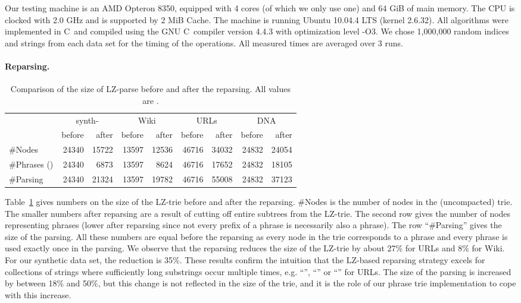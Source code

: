 \documentclass{llncs}
\newcommand{\Cpp}{C\raisebox{2pt}{{\relsize{-3}++}}\ }
\begin{document}
Our testing machine is an AMD Opteron 8350, equipped with 4 cores (of which we only use one) and 64 GiB of main memory. The CPU is clocked with 2.0 GHz and is supported by 2 MiB Cache. The machine is running Ubuntu 10.04.4 LTS (kernel 2.6.32). All algorithms were implemented in \Cpp and compiled using the GNU \Cpp compiler version 4.4.3 with optimization level -O3. 
We chose 1,000,000 random indices and strings from each data set for the timing of the operations.
All measured times are averaged over 3 runs.

\paragraph{Reparsing.}
\begin{table}[t]
\caption{Comparison of the size of LZ-parse before and after the reparsing. All values are .}
\label{tab:datasets}
\centering
\begin{tabular}{lrrrrrrrr}
\toprule
& \multicolumn{2}{c}{synth-} & \multicolumn{2}{c}{Wiki} & \multicolumn{2}{c}{URLs}  & \multicolumn{2}{c}{DNA}\\
\cmidrule(lr){2-3} \cmidrule(lr){4-5} \cmidrule(lr){6-7} \cmidrule(lr){8-9}
		 & before & after & before & after 	& before & after & before & after  \\
\midrule
\#Nodes 		& 24340 & 15722 & 13597 & 12536	& 46716	& 34032 & 24832	& 24054 \\
\#Phrases () & 24340 & 6873 & 13597  & 8624	& 46716	& 17652	& 24832	& 18105 \\
\#Parsing		 & 24340 & 21324 & 13597& 19782 & 46716	& 55008	& 24832	& 37123 \\
\bottomrule
\end{tabular}
\end{table}
Table~\ref{tab:datasets} gives numbers on the size of the LZ-trie before and after the reparsing. \#Nodes is the number of nodes in the (uncompacted) trie. The smaller numbers after reparsing are a result of cutting off entire subtrees from the LZ-trie. The second row gives the number of nodes representing phrases (lower after reparsing since not every prefix of a phrase is necessarily also a phrase). The row ``\#Parsing'' gives the size of the parsing.
All these numbers are equal before the reparsing as every node in the trie corresponds to a phrase and every phrase is used exactly once in the parsing.
We observe that the reparsing reduces the size of the LZ-trie by about 27\% for URLs and 8\% for Wiki. For our synthetic data set, the reduction is 35\%. These results confirm the intuition that the LZ-based reparsing strategy excels for collections of strings where sufficiently long substrings occur multiple times, e.g.    ``'', ``'' or ``'' for URLs. The size of the parsing is increased by between 18\% and 50\%, but this change is not reflected in the size of the trie, and it is the role of our phrase trie implementation to cope with this increase.
\end{document}
